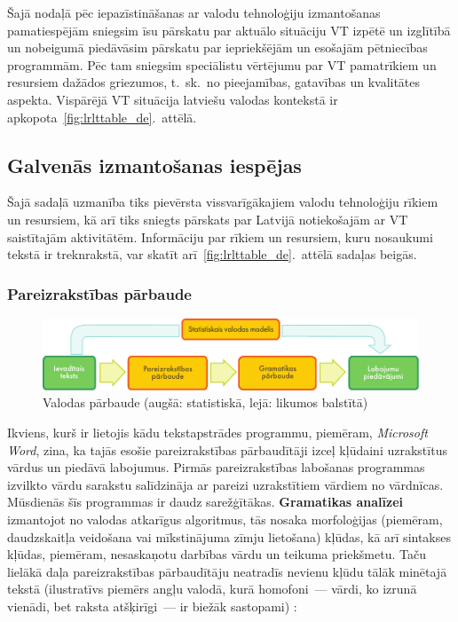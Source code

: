\begin{multicols}{2}
Šajā nodaļā pēc iepazīstināšanas ar valodu tehnoloģiju izmantošanas pamatiespējām sniegsim īsu pārskatu par aktuālo situāciju VT izpētē un izglītībā un nobeigumā piedāvāsim pārskatu par iepriekšējām un esošajām pētniecības programmām.  Pēc tam sniegsim speciālistu vērtējumu par VT pamatrīkiem un resursiem dažādos griezumos, t.~sk.~no pieejamības, gatavības un kvalitātes aspekta.  Vispārējā VT situācija latviešu valodas kontekstā ir apkopota~\ref{fig:lrlttable_de}.~attēlā.

\subsection{Galvenās izmantošanas iespējas}

Šajā sadaļā uzmanība tiks pievērsta vissvarīgākajiem valodu tehnoloģiju rīkiem un resursiem, kā arī tiks sniegts pārskats par Latvijā notiekošajām ar VT saistītajām aktivitātēm.
Informāciju par rīkiem un resursiem, kuru nosaukumi tekstā ir treknrakstā, var skatīt arī~\ref{fig:lrlttable_de}.~attēlā sadaļas beigās.  


\subsubsection{Pareizrakstības pārbaude}

\begin{figure}[b]
  \center
  \includegraphics[width=\textwidth]{../_media/latvian/language_checking}
  \caption{Valodas pārbaude (augšā: statistiskā, lejā: likumos balstītā)}
  \label{fig:langcheckingaarch_de}
\end{figure}

Ikviens, kurš ir lietojis kādu tekstapstrādes programmu, piemēram, \textit{Microsoft Word}, zina, ka tajās esošie pareizrakstības pārbaudītāji izceļ kļūdaini uzrakstītus vārdus un piedāvā labojumus.  Pirmās pareizrakstības labošanas programmas izvilkto vārdu sarakstu salīdzināja ar pareizi uzrakstītiem vārdiem no vārdnīcas.  Mūsdienās šīs programmas ir daudz sarežģītākas.  \textbf{Gramatikas analīzei} izmantojot no valodas atkarīgus algoritmus, tās nosaka morfoloģijas (piemēram, daudzskaitļa veidošana vai mīkstinājuma zīmju lietošana) kļūdas, kā arī sintakses kļūdas, piemēram, nesaskaņotu darbības vārdu un teikuma priekšmetu.  Taču lielākā daļa pareizrakstības pārbaudītāju neatradīs nevienu kļūdu tālāk minētajā tekstā (ilustratīvs piemērs angļu valodā, kurā homofoni~--- vārdi, ko izrunā vienādi, bet raksta atšķirīgi~--- ir biežāk sastopami) \cite{Meta15}:


\end{multicols}
